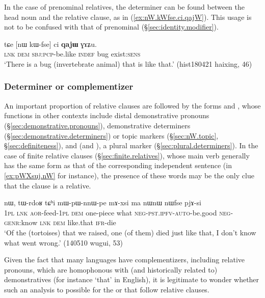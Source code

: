 In the case of prenominal relatives, the determiner  can be found between the head noun and the relative clause, as in (\ref{ex:nW.kWfse.ci.qajW}). This usage is not to be confused with that of prenominal  (§\ref{sec:identity.modifier}).

\begin{exe}
\ex \label{ex:nW.kWfse.ci.qajW}
\gll tɕe [nɯ kɯ-fse] ci \textbf{qajɯ} ɣɤʑu. \\
\textsc{lnk} \textsc{dem} \textsc{sbj}:\textsc{pcp}-be.like \textsc{indef} bug exist:\textsc{sens} \\
\glt  `There is a bug (invertebrate animal) that is like that.' (hist180421 haixing, 46)
\end{exe} 

\subsubsection{Determiner or complementizer} \label{sec:relative.determiners.complementizer}
An important proportion of relative clauses are followed by the forms  and , whose functions in other contexts include distal demonstrative pronouns (§\ref{sec:demonstrative.pronouns}), demonstrative determiners (§\ref{sec:demonstrative.determiners}) or topic markers (§\ref{sec:nW.topic}, §\ref{sec:definiteness}), and  (and ), a plural marker (§\ref{sec:plural.determiners}). In the case of finite relative clauses (§\ref{sec:finite.relatives}), whose main verb generally has the same form as that of the corresponding independent sentence (in \ref{ex:pWXsuj.nW} for instance), the presence of these words may be the only clue that the clause is a relative.

\begin{exe}
\ex \label{ex:pWXsuj.nW}
 nɯ, tɯ-rdoʁ tɕʰi mɯ-pɯ-nnɯ-pe mɤ-xsi ma nɯnɯ nɯfse pjɤ-si \\
\textsc{1pl} \textsc{lnk} \textsc{aor}-feed-\textsc{1pl} \textsc{dem} one-piece what \textsc{neg}-\textsc{pst}.\textsc{ipfv}-\textsc{auto}-be.good \textsc{neg}-\textsc{genr}:know \textsc{lnk} \textsc{dem} like.that \textsc{ifr}-die \\
\glt `Of the (tortoises) that we raised, one (of them) died just like that, I don't know what went wrong.' (140510 wugui, 53)
\end{exe}  

Given the fact that many languages have complementizers, including relative pronouns, which are homophonous with (and historically related to) demonstratives (for instance `that' in English), it is legitimate to wonder whether such an analysis to possible for the  or  that follow relative clauses.


